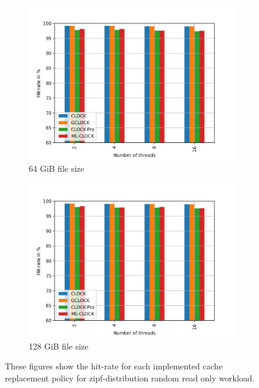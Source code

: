 \documentclass[
	12pt,
	a4paper,
	abstract,
	bibliography=totoc,
	chapterprefix,
	headings=openright,
	numbers=endperiod,
	parskip=half,
	twoside,
]{scrreprt}
\begin{document}
\begin{figure}[H]
\begin{subfigure}{0.4\textwidth}
	\end{subfigure}
	\hfill
	\begin{subfigure}{0.4\textwidth}
		\includegraphics[width=\textwidth]{multi_64_gb_randread_zipf.jpg}		
		\caption{64 GiB file size}
		\label{fig:rw_90to10  zoned}
	\end{subfigure}
	\hfill
	\begin{subfigure}{0.4\textwidth}
		\includegraphics[width=\textwidth]{multi_128_gb_randread_zipf.jpg}		
		\caption{128 GiB file size}
		\label{fig:rw_90to10  uniform}
	\end{subfigure}
	\caption{These figures show the hit-rate for each implemented cache replacement policy for zipf-distribution random read only workload.}
\end{figure}
\end{document}

